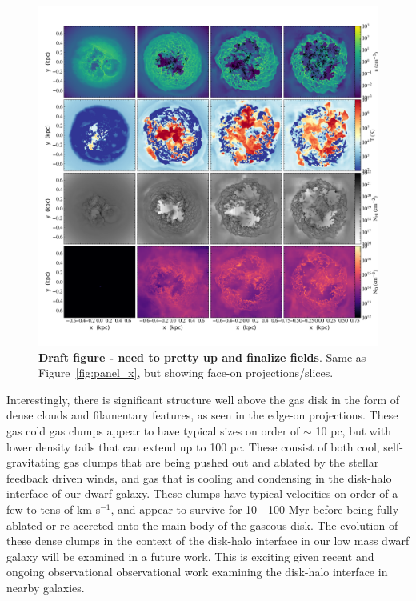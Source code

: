 \documentclass[twocolumn]{aastex61}
\begin{document}
\begin{figure}
\centering
\includegraphics[width=0.975\linewidth]{multiplot_4x4_z.png}
\caption{\textbf{Draft figure - need to pretty up and finalize fields}. Same as Figure~\ref{fig:panel_x}, but showing face-on projections/slices.}
\label{fig:panel_z}
\end{figure}

Interestingly, there is significant structure well above the gas disk in the form of dense clouds and filamentary features, as seen in the edge-on projections. These gas cold gas clumps appear to have typical sizes on order of $\sim$ 10 pc, but with lower density tails that can extend up to 100 pc. These consist of both cool, self-gravitating gas clumps that are being pushed out and ablated by the stellar feedback driven winds, and gas that is cooling and condensing in the disk-halo interface of our dwarf galaxy. These clumps have typical velocities on order of a few to tens of km s$^{-1}$, and appear to survive for 10 - 100 Myr before being fully ablated or re-accreted onto the main body of the gaseous disk. The evolution of these dense clumps in the context of the disk-halo interface in our low mass dwarf galaxy will be examined in a future work. This is exciting given recent \citep[e.g.][]{Zheng2017} and ongoing \citep{Zheng2017HST} observational observational work examining the disk-halo interface in nearby galaxies.
\end{document}
